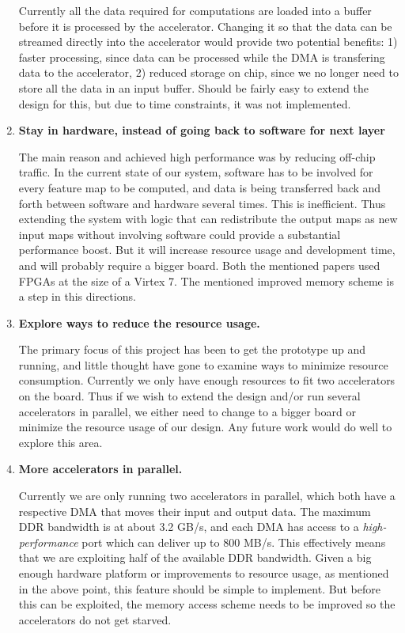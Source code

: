 \begin{enumerate}
	Currently all the data required for computations are loaded into a buffer before it is processed by the accelerator. Changing it so that the data can be streamed directly into the accelerator would provide two potential benefits: 1) faster processing, since data can be processed while the DMA is transfering data to the accelerator, 2) reduced storage on chip, since we no longer need to store all the data in an input buffer. Should be fairly easy to extend the design for this, but due to time constraints, it was not implemented. 

  \item \textbf{Stay in hardware, instead of going back to software for next layer}
	
	The main reason \cite{Zhang2015} and \cite{Ovtcharov2015} achieved high performance was by reducing off-chip traffic. In the current state of our system, software has to be involved for every feature map to be computed, and data is being transferred back and forth between software and hardware several times. This is inefficient. Thus extending the system with logic that can redistribute the output maps as new input maps without involving software could provide a substantial performance boost. But it will increase resource usage and development time, and will probably require a bigger board. Both the mentioned papers used FPGAs at the size of a Virtex 7. The mentioned improved memory scheme is a step in this directions. 
	
	\item \textbf{Explore ways to reduce the resource usage.}
	
	The primary focus of this project has been to get the prototype up and running, and little thought have gone to examine ways to minimize resource consumption. Currently we only have enough resources to fit two accelerators on the board. Thus if we wish to extend the design and/or run several accelerators in parallel, we either need to change to a bigger board or minimize the resource usage of our design. Any future work would do well to explore this area. 
	

	
	\item \textbf{More accelerators in parallel.}
	
	Currently we are only running two accelerators in parallel, which both have a respective DMA that moves their input and output data. The maximum DDR bandwidth is at about 3.2 GB/s, and each DMA has access to a \textit{high-performance} port which can  deliver up to 800 MB/s. This effectively means that we are exploiting half of the available DDR bandwidth. Given a big enough hardware platform or improvements to resource usage, as mentioned in the above point, this feature should be simple to implement. But before this can be exploited, the memory access scheme needs to be improved so the accelerators do not get starved. 
	

\end{enumerate}
